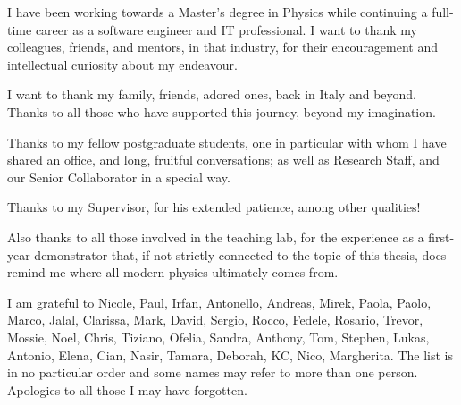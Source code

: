 I have been working towards a Master's degree in Physics
while continuing a full-time career as a software engineer and IT professional. 
I want to thank my colleagues, friends, and mentors, in that industry,
for their encouragement and intellectual curiosity about my endeavour. 

I want to thank my family, friends, adored ones, back in Italy and beyond.
Thanks to all those who have supported this journey, beyond my imagination.

Thanks to my fellow postgraduate students, one in particular with whom I have shared
an office, and long, fruitful conversations;
as well as Research Staff, and our Senior Collaborator in a special way. 

Thanks to my Supervisor, for his extended patience, among other qualities!

Also thanks to all those involved in the teaching lab, 
for the experience as a first-year demonstrator that, 
if not strictly connected to the topic of this thesis, 
does remind me where all modern physics ultimately comes from.

I am grateful to Nicole, Paul, Irfan, Antonello, Andreas, Mirek, Paola, Paolo, Marco,
Jalal, Clarissa, Mark, David, Sergio, Rocco, Fedele, Rosario, Trevor, Mossie, Noel, Chris, Tiziano, Ofelia,
Sandra, Anthony, Tom, Stephen, Lukas, Antonio, Elena, Cian, Nasir, Tamara, 
Deborah, KC, Nico, Margherita. The list is in no particular order and some names may refer to more than one person.
Apologies to all those I may have forgotten.
